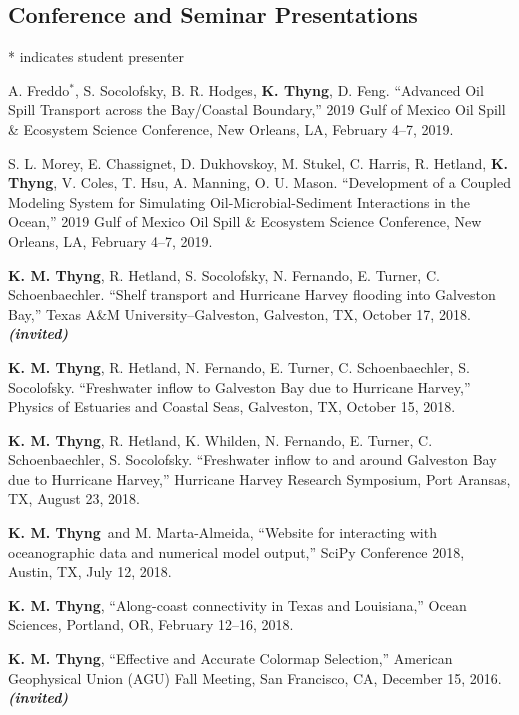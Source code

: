 \documentclass[10pt,letterpaper]{article}
\newcommand{\kmt}{\textbf{K. M. Thyng}}
\newcommand{\kt}{\textbf{K. Thyng}}
\newcommand{\inv}{\textbf{\textit{(invited)}}}
\renewenvironment{itemize}{
  \begin{list}{}{
    \setlength{\leftmargin}{1.5em}
    \setlength{\itemsep}{0.25em}
    \setlength{\parskip}{0pt}
    \setlength{\parsep}{0.25em}
  }
}{
  \end{list}
}
\begin{document}
\subsection*{Conference and Seminar Presentations}
* indicates student presenter
\begin{itemize}

\item A. Freddo$^*$, S. Socolofsky, B. R. Hodges, \kt, D. Feng. ``Advanced Oil Spill Transport across the Bay/Coastal Boundary,'' 2019 Gulf of Mexico Oil Spill \& Ecosystem Science Conference, New Orleans, LA, February 4--7, 2019.

\item S. L. Morey, E. Chassignet, D. Dukhovskoy, M. Stukel, C. Harris, R. Hetland, \kt, V. Coles, T. Hsu, A. Manning, O. U. Mason. ``Development of a Coupled Modeling System for Simulating Oil-Microbial-Sediment
Interactions in the Ocean,'' 2019 Gulf of Mexico Oil Spill \& Ecosystem Science Conference, New Orleans, LA, February 4--7, 2019.

\item \kmt, R. Hetland, S. Socolofsky, N. Fernando, E. Turner, C. Schoenbaechler. ``Shelf transport and Hurricane Harvey flooding into Galveston Bay,'' Texas A\&M University--Galveston, Galveston, TX, October 17, 2018. \inv

\item \kmt, R. Hetland, N. Fernando, E. Turner, C. Schoenbaechler, S. Socolofsky. ``Freshwater inflow to Galveston Bay due to Hurricane Harvey,'' Physics of Estuaries and Coastal Seas, Galveston, TX, October 15, 2018.

\item \kmt, R. Hetland, K. Whilden, N. Fernando, E. Turner, C. Schoenbaechler, S. Socolofsky. ``Freshwater inflow to and around Galveston Bay due to Hurricane Harvey,'' Hurricane Harvey Research Symposium, Port Aransas, TX, August 23, 2018.

\item \kmt~and M. Marta-Almeida, ``Website for interacting with oceanographic data and numerical model output,'' SciPy Conference 2018, Austin, TX, July 12, 2018.

\item \kmt, ``Along-coast connectivity in Texas and Louisiana,'' Ocean Sciences, Portland, OR, February 12--16, 2018.

\item \kmt, ``Effective and Accurate Colormap Selection,'' American Geophysical Union (AGU) Fall Meeting, San Francisco, CA, December 15, 2016. \inv


\end{itemize}
\end{document}
